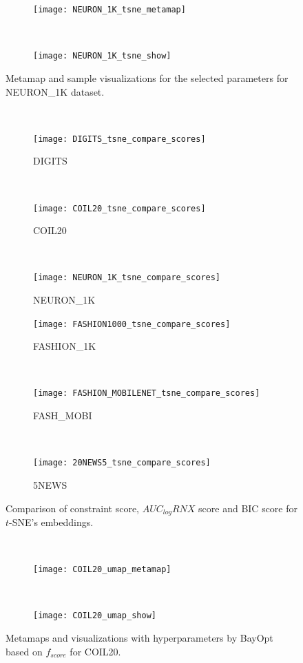 \begin{figure}[ht!]
    \centering
    \begin{subfigure}[b]{.8\linewidth}
        \texttt{[image: NEURON\_1K\_tsne\_metamap]}
    \end{subfigure}
    ~
    \begin{subfigure}[b]{.8\linewidth}
        \texttt{[image: NEURON\_1K\_tsne\_show]}
    \end{subfigure}
    \caption{Metamap and sample visualizations for the selected parameters for {NEURON\_1K} dataset.}
    \label{fig:tsne:meta:NEURON1K}
\end{figure}
~
\begin{figure}[ht!]
    \centering
    \begin{subfigure}[b]{0.3\linewidth}
        \centering
        \texttt{[image: DIGITS\_tsne\_compare\_scores]}
        \caption{DIGITS}
    \end{subfigure}
    ~
    \begin{subfigure}[b]{0.3\linewidth}
        \texttt{[image: COIL20\_tsne\_compare\_scores]}
        \caption{COIL20}
    \end{subfigure}
    ~
    \begin{subfigure}[b]{0.3\linewidth}
        \texttt{[image: NEURON\_1K\_tsne\_compare\_scores]}
        \caption{NEURON\_1K}
    \end{subfigure}
    \vfill
    \begin{subfigure}[b]{0.3\linewidth}
        \centering
        \texttt{[image: FASHION1000\_tsne\_compare\_scores]}
        \caption{FASHION\_1K}
    \end{subfigure}
    ~
    \begin{subfigure}[b]{0.3\linewidth}
        \texttt{[image: FASHION\_MOBILENET\_tsne\_compare\_scores]}
        \caption{FASH\_MOBI}
    \end{subfigure}
    ~
    \begin{subfigure}[b]{0.3\linewidth}
        \texttt{[image: 20NEWS5\_tsne\_compare\_scores]}
        \caption{5NEWS}
    \end{subfigure}
    \caption{Comparison of constraint score, $AUC_{log}RNX$ score and BIC score for $t$-SNE's embeddings.}
    \label{fig:tsne:compare}
\end{figure}
~
\begin{figure}[ht!]
    \centering
    \begin{subfigure}[b]{.8\linewidth}
        \centering
        \texttt{[image: COIL20\_umap\_metamap]}
    \end{subfigure}
    ~
    \begin{subfigure}[b]{.8\linewidth}
        \texttt{[image: COIL20\_umap\_show]}
    \end{subfigure}
    \caption{Metamaps and visualizations with hyperparameters by BayOpt based on $f_{score}$ for COIL20.}
    \label{fig:umap:meta:COIL20}
\end{figure}
